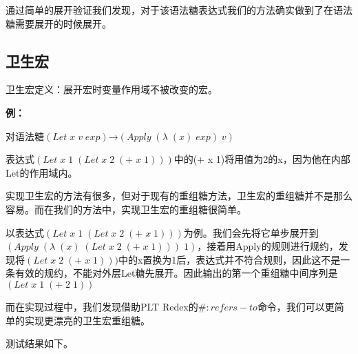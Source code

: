 通过简单的展开验证我们发现，对于该语法糖表达式我们的方法确实做到了在语法糖需要展开的时候展开。

\label{mark:hygienic}\subsection{卫生宏}

卫生宏定义：展开宏时变量作用域不被改变的宏。

{\bfseries 例：}

对语法糖$(Let\;x\;v\;exp)$→$(Apply\;(\lambda\;(x)\;exp)\;v)$

表达式$(Let\;x\;1\;(Let\;x\;2\;(+\;x\;1)))$中的(+ x 1)将用值为2的x，因为他在内部Let的作用域内。

实现卫生宏的方法有很多，但对于现有的重组糖方法，卫生宏的重组糖并不是那么容易。而在我们的方法中，实现卫生宏的重组糖很简单。

以表达式$(Let\;x\;1\;(Let\;x\;2\;(+\;x\;1)))$为例。我们会先将它单步展开到
$(Apply\;(\lambda\;(x)\;(Let\;x\;2\;(+\;x\;1)))\;1)$，接着用Apply的规则进行规约，发现将$(Let\;x\;2\;(+\;x\;1)))$中的x置换为1后，表达式并不符合规则，因此这不是一条有效的规约，不能对外层Let糖先展开。因此输出的第一个重组糖中间序列是$(Let\;x\;1\;(+\;2\;1))$

而在实现过程中，我们发现借助PLT Redex的$\#:refers-to$命令，我们可以更简单的实现更漂亮的卫生宏重组糖。

测试结果如下。
\begin{center}
\end{center}

